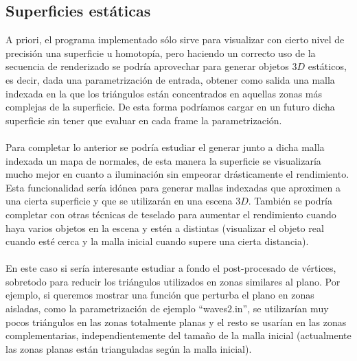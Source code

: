 \subsection*{Superficies estáticas}
A priori, el programa implementado sólo sirve para visualizar con cierto nivel de precisión una superficie u homotopía, pero haciendo un correcto uso de la secuencia de renderizado se podría aprovechar para generar objetos $3D$ estáticos, es decir, dada una parametrización de entrada, obtener como salida una malla indexada en la que los triángulos están concentrados en aquellas zonas más complejas de la superficie. De esta forma podríamos cargar en un futuro dicha superficie sin tener que evaluar en cada frame la parametrización.\\
\\Para completar lo anterior se podría estudiar el generar junto a dicha malla indexada un mapa de normales, de esta manera la superficie se visualizaría mucho mejor en cuanto a iluminación sin empeorar drásticamente el rendimiento. Esta funcionalidad sería idónea para generar mallas indexadas que aproximen a una cierta superficie y que se utilizarán en una escena $3D$. También se podría completar con otras técnicas de teselado para aumentar el rendimiento cuando haya varios objetos en la escena y estén a distintas (visualizar el objeto real cuando esté cerca y la malla inicial cuando supere una cierta distancia).\\
\\En este caso si sería interesante estudiar a fondo el post-procesado de vértices, sobretodo para reducir los triángulos utilizados en zonas similares al plano. Por ejemplo, si queremos mostrar una función que perturba el plano en zonas aisladas, como la parametrización de ejemplo ``waves$2$.in'', se utilizarían muy pocos triángulos en las zonas totalmente planas y el resto se usarían en las zonas complementarias, independientemente del tamaño de la malla inicial (actualmente las zonas planas están trianguladas según la malla inicial).

\endinput
